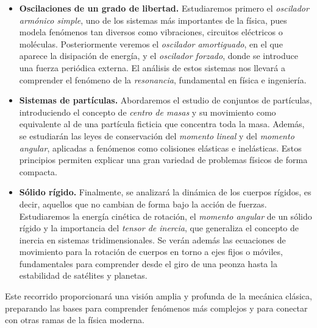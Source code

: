 \documentclass[a4paper,12pt]{article}
\begin{document}
\begin{itemize}
    \item \textbf{Oscilaciones de un grado de libertad.} 
    Estudiaremos primero el \emph{oscilador armónico simple}, uno de los sistemas más importantes de la física, pues modela fenómenos tan diversos como vibraciones, circuitos eléctricos o moléculas. Posteriormente veremos el \emph{oscilador amortiguado}, en el que aparece la disipación de energía, y el \emph{oscilador forzado}, donde se introduce una fuerza periódica externa. El análisis de estos sistemas nos llevará a comprender el fenómeno de la \emph{resonancia}, fundamental en física e ingeniería.

    \item \textbf{Sistemas de partículas.} 
    Abordaremos el estudio de conjuntos de partículas, introduciendo el concepto de \emph{centro de masas} y su movimiento como equivalente al de una partícula ficticia que concentra toda la masa. Además, se estudiarán las leyes de conservación del \emph{momento lineal} y del \emph{momento angular}, aplicadas a fenómenos como colisiones elásticas e inelásticas. Estos principios permiten explicar una gran variedad de problemas físicos de forma compacta.

    \item \textbf{Sólido rígido.} 
    Finalmente, se analizará la dinámica de los cuerpos rígidos, es decir, aquellos que no cambian de forma bajo la acción de fuerzas. Estudiaremos la energía cinética de rotación, el \emph{momento angular} de un sólido rígido y la importancia del \emph{tensor de inercia}, que generaliza el concepto de inercia en sistemas tridimensionales. Se verán además las ecuaciones de movimiento para la rotación de cuerpos en torno a ejes fijos o móviles, fundamentales para comprender desde el giro de una peonza hasta la estabilidad de satélites y planetas.
\end{itemize}

Este recorrido proporcionará una visión amplia y profunda de la mecánica clásica, preparando las bases para comprender fenómenos más complejos y para conectar con otras ramas de la física moderna.
\end{document}
